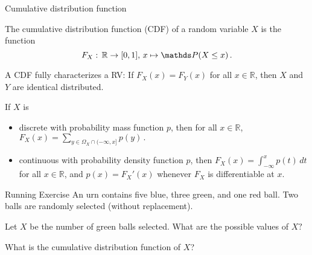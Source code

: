 \begin{vbframe}{Cumulative distribution function}
 
 The cumulative distribution function (CDF) of a random variable $X$ is the function
		$$
		F_X:\, \mathbb{R} \to [0,1], \, x \mapsto \P(X \leq x) \, .
		$$
		
A CDF fully characterizes a RV: If $F_X(x) = F_Y(x)$ for all $x \in \mathbb{R}$, then $X$ and $Y$ are identical distributed.
		
		\lz
		

If $X$ is 
\begin{itemize}
%	
	\item discrete with probability mass function $p$, then for all $x \in \mathbb{R}$, 
	$
	F_X(x) = \sum_{y \in \Omega_X \cap (-\infty, x]} p(y) \, .
	$
%	
	\item continuous with probability density function $p$, then 
	$
	F_X(x)  = \int_{-\infty}^x p(t) \, dt 
	$
	for all $x \in \mathbb{R}$, and $p(x) = F_X'(x)$ whenever $F_X$ is differentiable at $x$. 
%	
\end{itemize}

\end{vbframe}


\begin{vbframe}{Running Exercise}  
	An urn contains five blue, three green, and one red ball. Two balls are randomly selected (without replacement).
	
	\lz
	
	
	
	Let $X$ be the number of green balls selected. What are the possible values of $X?$
	
	
	\lz
	
	\lz
	\lz
	\lz
	
	What is the cumulative distribution function of $X$?
	
	
	
\end{vbframe}

